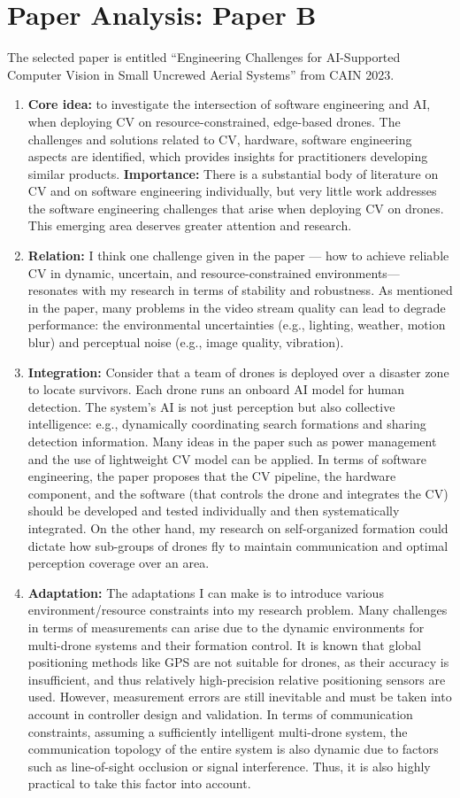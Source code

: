 \documentclass[11pt]{article}
\begin{document}
\section{Paper Analysis: Paper B}
The selected paper is entitled ``Engineering Challenges for AI-Supported Computer Vision in Small Uncrewed Aerial Systems'' from CAIN 2023. 
\begin{enumerate}
    \item \textbf{Core idea:} to investigate the intersection of software engineering and AI, when deploying CV on resource-constrained, edge-based drones. The challenges and solutions related to CV, hardware, software engineering aspects are identified, which provides insights for practitioners developing similar products. \textbf{Importance:} There is a substantial body of literature on CV and on software engineering individually, but very little work addresses the software engineering challenges that arise when deploying CV on drones. This emerging area deserves greater attention and research.
    \item \textbf{Relation:} I think one challenge given in the paper --- how to achieve reliable CV in dynamic, uncertain, and resource-constrained environments--- resonates with my research in terms of stability and robustness. As mentioned in the paper, many problems in the video stream quality can lead to degrade performance: the environmental uncertainties (e.g., lighting, weather, motion blur) and perceptual noise (e.g., image quality, vibration).
    \item \textbf{Integration:} Consider that a team of drones is deployed over a disaster zone to locate survivors. Each drone runs an onboard AI model for human detection. The system's AI is not just perception but also collective intelligence: e.g., dynamically coordinating search formations and sharing detection information. Many ideas in the paper such as  power management and the use of lightweight CV model can be applied. In terms of software engineering, the paper proposes that the CV pipeline, the hardware component, and the software (that controls the drone and integrates the CV) should be developed and tested individually and then systematically integrated. On the other hand, my research on self-organized formation could dictate how sub-groups of drones fly to maintain communication and optimal perception coverage over an area.
    \item \textbf{Adaptation:} The adaptations I can make is to introduce various environment/resource constraints into my research problem. Many challenges in terms of measurements can arise due to the dynamic environments for multi-drone systems and their formation control. It is known that global positioning methods like GPS are not suitable for drones, as their accuracy is insufficient, and thus relatively high-precision relative positioning sensors are used. However, measurement errors are still inevitable and must be taken into account in controller design and validation. In terms of communication constraints, assuming a sufficiently intelligent multi-drone system, the communication topology of the entire system is also dynamic due to factors such as line-of-sight occlusion or signal interference. Thus, it is also highly practical to take this factor into account.

\end{enumerate}
\end{document}
